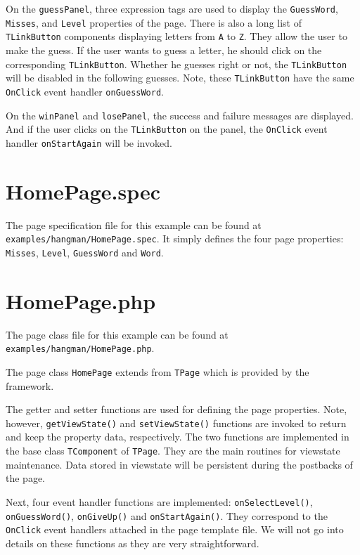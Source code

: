\documentclass{book}
\begin{document}
On the \verb|guessPanel|, three expression tags are used to
display the \verb|GuessWord|, \verb|Misses|, and \verb|Level|
properties of the page. There is also a long list of
\verb|TLinkButton| components displaying letters from \verb|A| to
\verb|Z|. They allow the user to make the guess. If the user wants
to guess a letter, he should click on the corresponding
\verb|TLinkButton|. Whether he guesses right or not, the
\verb|TLinkButton| will be disabled in the following guesses.
Note, these \verb|TLinkButton| have the same \verb|OnClick| event
handler \verb|onGuessWord|.


On the \verb|winPanel| and \verb|losePanel|, the success and
failure messages are displayed. And if the user clicks on the
\verb|TLinkButton| on the panel, the \verb|OnClick| event handler
\verb|onStartAgain| will be invoked.


\section{HomePage.spec}

The page specification file for this example can be found at
\verb|examples/hangman/HomePage.spec|. It simply defines the four
page properties: \verb|Misses|, \verb|Level|, \verb|GuessWord| and
\verb|Word|.


\section{HomePage.php}

The page class file for this example can be found at
\verb|examples/hangman/HomePage.php|.


The page class \verb|HomePage| extends from \verb|TPage| which is
provided by the framework.


The getter and setter functions are used for defining the page
properties. Note, however, \verb|getViewState()| and
\verb|setViewState()| functions are invoked to return and keep the
property data, respectively. The two functions are implemented in
the base class \verb|TComponent| of \verb|TPage|. They are the
main routines for viewstate maintenance. Data stored in viewstate
will be persistent during the postbacks of the page.


Next, four event handler functions are implemented:
\verb|onSelectLevel()|, \verb|onGuessWord()|, \verb|onGiveUp()|
and \verb|onStartAgain()|. They correspond to the \verb|OnClick|
event handlers attached in the page template file. We will not go
into details on these functions as they are very straightforward.
\end{document}
